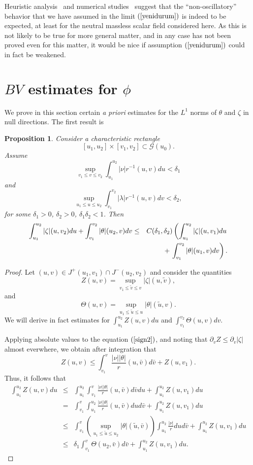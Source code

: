 \documentclass{article}
\newtheorem{proposition}[theorem]{Proposition}
\begin{document}
{Heuristic analysis~\cite{gpp:de1, rpr:ns, lb:sbh, bo:lt} and 
numerical studies~\cite{gpp:de, bo:lte} suggest that the ``non-oscillatory''
behavior that we have assumed in the limit $(\ref{yenidurum})$ is
indeed to be expected, at least for the neutral massless
scalar field considered
here. As this is not likely to be true for more general matter,
and in any case has not been proved even for this matter, it would
be nice if assumption $(\ref{yenidurum})$ could in fact be weakened.

\section{$BV$ estimates for $\phi$}
\label{bvesec}

We prove in this section certain \emph{a priori}
estimates for the $L^1$ norms of $\theta$ and $\zeta$ in
null directions. The first result is 

\begin{proposition}
\label{or9ogwvio}
Consider a characteristic rectangle 
\[
[u_1,u_2]\times[v_1,v_2]\subset\mathcal{G}(u_0).
\]
Assume 
\[
\sup_{v_1\le v\le v_2}\int_{u_1}^{u_2}{|\nu|r^{-1}(u,v)du}<\delta_1
\]
and 
\[
\sup_{u_1\le u\le u_2}\int_{v_1}^{v_2}{|\lambda|r^{-1}(u,v)dv}<\delta_2,
\] 
for some $\delta_1>0$, $\delta_2>0$, $\delta_1\delta_2<1$. 
Then 
\begin{eqnarray}
\label{L1}
\nonumber
\int_{u_1}^{u_2}{|\zeta|(u,v_2)du}+\int_{v_1}^{v_2}{|\theta|(u_2,v)dv}
&\le&
C(\delta_1,\delta_2)\left(\int_{u_1}^{u_2}{|\zeta|(u,v_1)du}\right.\\
&&\hbox{}+\left.
\int_{v_1}^{v_2}{|\theta|(u_1,v)dv}\right).
\end{eqnarray}
\end{proposition}

\begin{proof} Let $(u,v)\in J^+(u_1,v_1)\cap J^-(u_2,v_2)$
and consider the quantities 
\[
Z(u,v)=\sup_{v_1\le\tilde v\le v}
|\zeta|(u,\tilde{v}),
\] 
and
\[
\Theta(u,v)=\sup_{u_1\le\tilde u\le u}|\theta|
(\tilde{u},v).
\]
We will derive in fact estimates for 
$\int_{u_1}^{u_2}{Z(u,v)du}$ and $\int_{v_1}^{v_2}{\Theta(u,v) dv}$.

Applying absolute values to the equation $(\ref{sign2})$,
and noting that $\partial_vZ\le\partial_v|\zeta|$ almost everwhere,
we obtain after integration that
\[
Z(u,v)\le\int_{v_1}^v{\frac{|\nu||\theta|}r(u,\bar{v})d\bar{v}}+Z(u,v_1).
\]
Thus, it follows that
\begin{eqnarray*}
\int_{u_1}^{u_2}{Z(u,v)du}&\le&
\int_{u_1}^{u_2}{\int_{v_1}^v{\frac{|\nu||\theta|}r(u,\bar{v})d\bar{v}}du}
+\int_{u_1}^{u_2}
{Z(u,v_1)du}\\
&=&\int_{v_1}^v{\int_{u_1}^{u_2}{\frac{|\nu||\theta|}r(u,\bar{v})du}
d\bar{v}}+\int_{u_1}^{u_2}{Z(u,v_1)du}\\
&\le&\int_{v_1}^v{\left(\sup_{u_1\le\tilde{u}\le u_2}
|\theta|(\tilde{u},\bar{v})\right)\int_{u_1}^{u_2}{\frac{|\nu|}rdu}d\bar{v}}
+\int_{u_1}^{u_2}{Z(u,v_1)du}\\
&\le&\delta_1\int_{v_1}^v{\Theta(u_2,\bar{v})d\bar{v}}+\int_{u_1}^{u_2}{Z(u,v_1)du}.
\end{eqnarray*}


\end{proof}}
\end{document}
